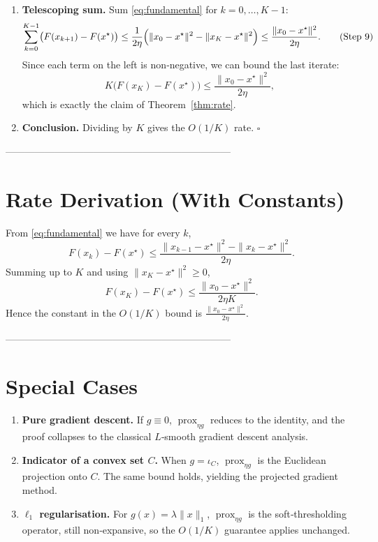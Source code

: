 \documentclass{article}
\newcommand{\prox}{\operatorname{prox}}
\begin{document}
\begin{enumerate}
\item[Step 9.] \textbf{Telescoping sum.}  
Sum \eqref{eq:fundamental} for $k=0,\dots,K-1$:
\[
\sum_{k=0}^{K-1}\bigl(F(x_{k+1})-F(x^{\star})\bigr)
\le \frac{1}{2\eta}\Bigl(\|x_{0}-x^{\star}\|^{2}
                       -\|x_{K}-x^{\star}\|^{2}\Bigr)
\le \frac{\|x_{0}-x^{\star}\|^{2}}{2\eta}.
\tag{Step 9}
\]
Since each term on the left is non‑negative, we can bound the last iterate:
\[
K\bigl(F(x_{K})-F(x^{\star})\bigr)
\le \frac{\|x_{0}-x^{\star}\|^{2}}{2\eta},
\]
which is exactly the claim of Theorem~\ref{thm:rate}.

\item[Step 10.] \textbf{Conclusion.}  
Dividing by $K$ gives the $O(1/K)$ rate. \hfill $\square$
\end{enumerate}

---------------------------------------------------------------------

\section*{Rate Derivation (With Constants)}
From \eqref{eq:fundamental} we have for every $k$,
\[
F(x_{k})-F(x^{\star})
\le \frac{\|x_{k-1}-x^{\star}\|^{2}-\|x_{k}-x^{\star}\|^{2}}{2\eta}.
\]
Summing up to $K$ and using $\|x_{K}-x^{\star}\|^{2}\ge 0$,
\[
F(x_{K})-F(x^{\star})
\le \frac{\|x_{0}-x^{\star}\|^{2}}{2\eta K}.
\]
Hence the constant in the $O(1/K)$ bound is $\frac{\|x_{0}-x^{\star}\|^{2}}{2\eta}$.

---------------------------------------------------------------------

\section*{Special Cases}
\begin{enumerate}[label=(\alph*)]
\item \textbf{Pure gradient descent.} If $g\equiv0$, $\prox_{\eta g}$ reduces to the identity, and the proof collapses to the classical $L$‑smooth gradient descent analysis.
\item \textbf{Indicator of a convex set $C$.}  
When $g=\iota_{C}$, $\prox_{\eta g}$ is the Euclidean projection onto $C$. The same bound holds, yielding the projected gradient method.
\item \textbf{$\ell_{1}$ regularisation.}  
For $g(x)=\lambda\|x\|_{1}$, $\prox_{\eta g}$ is the soft‑thresholding operator, still non‑expansive, so the $O(1/K)$ guarantee applies unchanged.
\end{enumerate}
\end{document}

